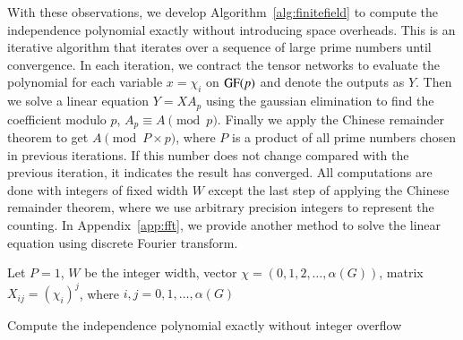 \documentclass[onefignum, onetabnum]{siamart190516}
\newcommand{\<}{\langle}
\renewcommand{\>}{\rangle}
\newcommand{\App}[1]{Appendix~\ref{#1}}
\begin{document}
With these observations, we develop Algorithm~\ref{alg:finitefield} to compute the independence polynomial exactly without introducing space overheads.
This is an iterative algorithm that iterates over a sequence of large prime numbers until convergence.
In each iteration, we contract the tensor networks to evaluate the polynomial for each variable $x = \chi_{i}$ on ${\rm GF}(p)$ and denote the outputs as $Y$.
Then we solve a linear equation $Y = X A_p$ using the gaussian elimination to find the coefficient modulo $p$, $A_p \equiv A \pmod p$.
Finally we apply the Chinese remainder theorem to get $A \pmod {P\times p}$, where $P$ is a product of all prime numbers chosen in previous iterations.
If this number does not change compared with the previous iteration, it indicates the result has converged.
All computations are done with integers of fixed width $W$ except the last step of applying the Chinese remainder theorem, where we use arbitrary precision integers to represent the counting.
In \App{app:fft}, we provide another method to solve the linear equation using discrete Fourier transform.

\LinesNumberedHidden
\begin{algorithm}[!ht]
    \small
    \SetAlgoNoLine
    Let $P = 1$, $W$ be the integer width, vector $\chi = (0,1,2, \ldots, \alpha(G))$, matrix $X_{ij} = (\chi_i)^j$, where $i,j = 0, 1, \ldots, \alpha(G)$\;

    \caption{Compute the independence polynomial exactly without integer overflow}\label{alg:finitefield} 
\end{algorithm}
\end{document}
